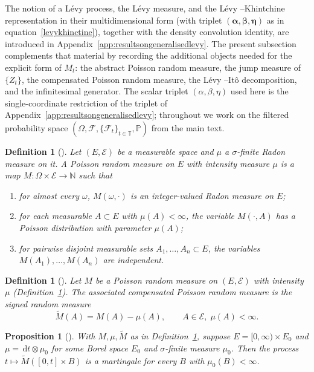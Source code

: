 \documentclass{article}
\newtheorem{defn}[thm]{Definition}
\newtheorem{prop}[thm]{Proposition}
\newcommand{\levy}{{L\'evy }}
\def\P{\mathbb{P}}
\def\N{\mathbb{N}}
\def\T{\mathbb{T}}
\def\d{\,\mathrm{d}}
\def\F{\mathcal{F}}
\theoremstyle{definition}
\begin{document}
The notion of a \levy process, the \levy measure, and the \levy--Khintchine representation in their multidimensional form (with triplet $(\boldsymbol{\alpha}, \boldsymbol{\beta}, \boldsymbol{\eta})$ as in equation~\eqref{levykhinctine}), together with the density convolution identity, are introduced in Appendix~\ref{app:resultsongeneralisedlevy}. The present subsection complements that material by recording the additional objects needed for the explicit form of $M_t$: the abstract Poisson random measure, the jump measure of $\{Z_t\}$, the compensated Poisson random measure, the \levy--It\^{o} decomposition, and the infinitesimal generator. The scalar triplet $(\alpha, \beta, \eta)$ used here is the single-coordinate restriction of the triplet of Appendix~\ref{app:resultsongeneralisedlevy}; throughout we work on the filtered probability space $(\Omega, \F, \{\F_t\}_{t \in \T}, \P)$ from the main text.

\begin{defn}[{\cite[Definition~2.18]{ContTankov2004}}]
\label{def:poisson-rm}
Let $(E, \mathcal{E})$ be a measurable space and $\mu$ a $\sigma$-finite Radon
measure on it. A \emph{Poisson random measure} on $E$ with intensity measure
$\mu$ is a map $M : \Omega \times \mathcal{E} \to \N$ such that
\begin{enumerate}
  \item for almost every $\omega$, $M(\omega, \cdot)$ is an integer-valued
    Radon measure on $E$;
  \item for each measurable $A \subset E$ with $\mu(A) < \infty$, the variable
    $M(\cdot, A)$ has a Poisson distribution with parameter $\mu(A)$;
  \item for pairwise disjoint measurable sets $A_1, \dots, A_n \subset E$, the
    variables $M(A_1), \dots, M(A_n)$ are independent.
\end{enumerate}
\end{defn}

\begin{defn}[{\cite[Section~2.6.2]{ContTankov2004}}]
\label{def:compensated-prm}
Let $M$ be a Poisson random measure on $(E, \mathcal{E})$ with intensity $\mu$ (Definition~\ref{def:poisson-rm}). The associated \emph{compensated Poisson random measure} is the signed random measure
\[
  \widetilde{M}(A) = M(A) - \mu(A), \qquad A \in \mathcal{E},\; \mu(A) < \infty.
\]
\end{defn}

\begin{prop}[{\cite[Proposition~2.16]{ContTankov2004}}]
\label{prop:compensated-prm-martingale}
With $M, \mu, \widetilde{M}$ as in Definition~\ref{def:compensated-prm}, suppose $E = [0, \infty) \times E_0$ and $\mu = \d t \otimes \mu_0$ for some Borel space $E_0$ and $\sigma$-finite measure $\mu_0$. Then the process $t \mapsto \widetilde{M}([0, t] \times B)$ is a martingale for every $B$ with $\mu_0(B) < \infty$.
\end{prop}
\end{document}
